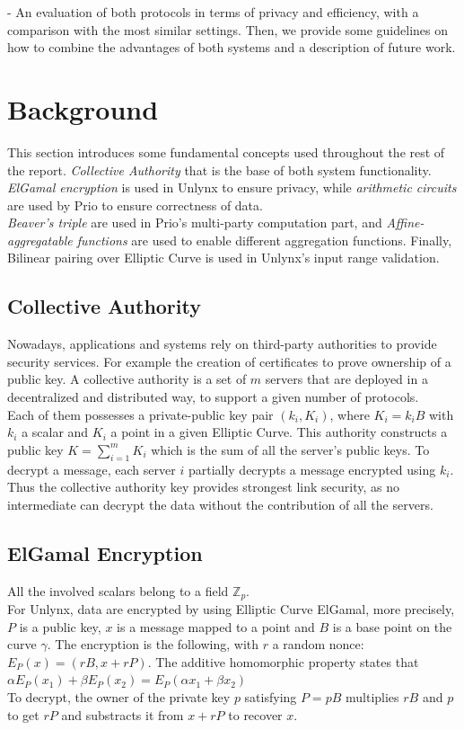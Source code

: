 \documentclass{article}
\begin{document}
- An evaluation of both protocols in terms of privacy and efficiency, with a comparison with the most similar settings. Then, we provide some guidelines on how to  combine the advantages of both systems and a description of future work.


\section*{Background}
This section introduces some fundamental concepts used throughout the rest of the report. \textit{Collective Authority} that is the base of both system functionality. \textit{ElGamal encryption} is used in Unlynx to ensure privacy, while \textit{arithmetic circuits} are used by Prio to ensure correctness of data.\\
\textit{Beaver's triple} are used in Prio's multi-party computation part, and \textit{Affine-aggregatable functions} are used to enable different aggregation functions. 
Finally, Bilinear pairing over Elliptic Curve is used in Unlynx's input range validation.\\

\subsection*{Collective Authority}
Nowadays, applications and systems rely on third-party authorities to provide security services. For example the creation of certificates to prove ownership of a public key. A collective authority is a set of $m$  servers that are deployed in a decentralized and distributed way, to support a given number of protocols.\\
Each of them possesses a private-public key pair $(k_i,K_i)$, where $K_i = k_i B$ with $k_i$ a scalar and $K_i$ a point in a given Elliptic Curve. This authority constructs a public key $K = \sum_{i=1}^{m}{K_i}$ which is the sum of all the server's public keys. To decrypt a message, each server $i$ partially decrypts a message encrypted using $k_{i}$. Thus the collective authority key provides strongest link security, as no intermediate can decrypt the data without the contribution of all the servers.

\subsection*{ElGamal Encryption}
All the involved scalars belong to a field $\mathbb{Z}_p$.\\
For Unlynx, data are encrypted by using Elliptic Curve ElGamal, more precisely, $P$ is a public key, $x$ is a message mapped to a point and $B$ is a base point on the curve $\gamma$. The encryption is the following, with $r$ a random nonce:\\
$E_P(x) = (rB,x+rP)$. The additive homomorphic property states that $\alpha E_P(x_1) + \beta E_P(x_2) = E_P(\alpha x_1+ \beta x_2)$\\
To decrypt, the owner of the private key $p$ satisfying $P = pB$ multiplies $rB$ and $p$ to get $rP$ and substracts it from $x + rP$ to recover $x$.\\
\end{document}
